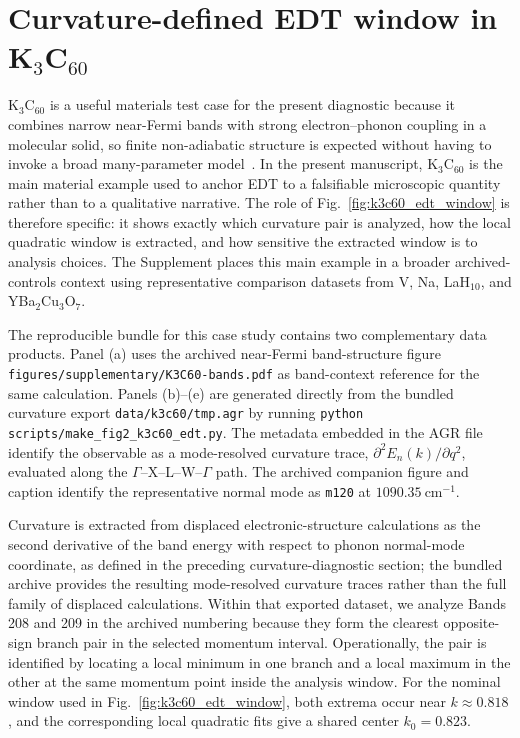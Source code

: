 \section{Curvature-defined EDT window in K$_3$C$_{60}$}

K$_3$C$_{60}$ is a useful materials test case for the present diagnostic because it combines narrow near-Fermi bands with strong electron--phonon coupling in a molecular solid, so finite non-adiabatic structure is expected without having to invoke a broad many-parameter model~\cite{Gunnarsson1997,Capone2009}. In the present manuscript, K$_3$C$_{60}$ is the main material example used to anchor EDT to a falsifiable microscopic quantity rather than to a qualitative narrative. The role of Fig.~\ref{fig:k3c60_edt_window} is therefore specific: it shows exactly which curvature pair is analyzed, how the local quadratic window is extracted, and how sensitive the extracted window is to analysis choices. The Supplement places this main example in a broader archived-controls context using representative comparison datasets from V, Na, LaH$_{10}$, and YBa$_2$Cu$_3$O$_7$.

The reproducible bundle for this case study contains two complementary data products. Panel (a) uses the archived near-Fermi band-structure figure \texttt{figures/supplementary/K3C60-bands.pdf} as band-context reference for the same calculation. Panels (b)--(e) are generated directly from the bundled curvature export \texttt{data/k3c60/tmp.agr} by running \texttt{python scripts/make\_fig2\_k3c60\_edt.py}. The metadata embedded in the AGR file identify the observable as a mode-resolved curvature trace, $\partial^2 E_n(k)/\partial q^2$, evaluated along the $\Gamma$--X--L--W--$\Gamma$ path. The archived companion figure and caption identify the representative normal mode as \texttt{m120} at $1090.35~\mathrm{cm}^{-1}$.

Curvature is extracted from displaced electronic-structure calculations as the second derivative of the band energy with respect to phonon normal-mode coordinate, as defined in the preceding curvature-diagnostic section; the bundled archive provides the resulting mode-resolved curvature traces rather than the full family of displaced calculations. Within that exported dataset, we analyze Bands 208 and 209 in the archived numbering because they form the clearest opposite-sign branch pair in the selected momentum interval. Operationally, the pair is identified by locating a local minimum in one branch and a local maximum in the other at the same momentum point inside the analysis window. For the nominal window used in Fig.~\ref{fig:k3c60_edt_window}, both extrema occur near $k \approx 0.818$, and the corresponding local quadratic fits give a shared center $k_0 = 0.823$.

